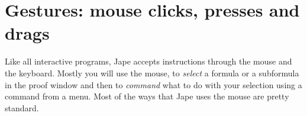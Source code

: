 \documentclass[11pt]{book}
\begin{document}
\chapter{Gestures: mouse clicks, presses and drags}
\label{chap:gestures}

Like all interactive programs, Jape accepts instructions through the mouse and the keyboard. Mostly you will use the mouse, to \emph{select} a formula or a subformula in the proof window and then to \emph{command} what to do with your selection using a command from a menu. Most of the ways that Jape uses the mouse are pretty standard.

\begin{figure}
\centering
{}
\quad
{}
\quad
{}

\end{figure}
\end{document}
